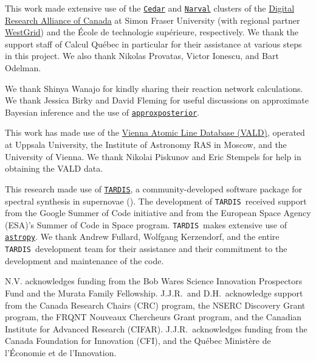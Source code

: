 \documentclass[twocolumn, twocolappendix]{aastex63}
\def\TARDIS{\texttt{TARDIS}}
\def\approxposterior{\texttt{approxposterior}}
\begin{document}
This work made extensive use of the \href{https://docs.alliancecan.ca/wiki/Cedar}{\texttt{Cedar}} and \href{https://docs.alliancecan.ca/wiki/Narval/en}{\texttt{Narval}} clusters of the \href{https://alliancecan.ca/en}{Digital Research Alliance of Canada} at Simon Fraser University (with regional partner \href{https://www.westgrid.ca/}{WestGrid}) and the {\'E}cole de technologie sup{\'e}rieure, respectively. We thank the support staff of Calcul Qu{\'e}bec in particular for their assistance at various steps in this project. We also thank Nikolas Provatas, Victor Ionescu, and Bart Odelman.

We thank Shinya Wanajo for kindly sharing their reaction network calculations. We thank Jessica Birky and David Fleming for useful discussions on approximate Bayesian inference and the use of \href{https://dflemin3.github.io/approxposterior/index.html}{\approxposterior}.

This work has made use of the \href{http://vald.astro.uu.se/~vald/php/vald.php}{Vienna Atomic Line Database (VALD)}, operated at Uppsala University, the Institute of Astronomy RAS in Moscow, and the University of Vienna. We thank Nikolai Piskunov and Eric Stempels for help in obtaining the VALD data.

This research made use of \href{https://tardis-sn.github.io/tardis/index.html}{\TARDIS}, a community-developed software package for spectral synthesis in supernovae (\citealt{kerzendorf14}). The development of \TARDIS~received support from the Google Summer of Code initiative and from the European Space Agency (ESA)'s Summer of Code in Space program. \TARDIS~makes extensive use of \href{https://docs.astropy.org/en/stable/}{\texttt{astropy}}. We thank Andrew Fullard, Wolfgang Kerzendorf, and the entire \TARDIS~development team for their assistance and their commitment to the development and maintenance of the code. 

N.V. acknowledges funding from the Bob Wares Science Innovation Prospectors Fund and the Murata Family Fellowship. J.J.R.\ and D.H.\ acknowledge support from the Canada Research Chairs (CRC) program, the NSERC Discovery Grant program, the FRQNT Nouveaux Chercheurs Grant program, and the Canadian Institute for Advanced Research (CIFAR). J.J.R.\ acknowledges funding from the Canada Foundation for Innovation (CFI), and the Qu\'{e}bec Ministère de l’\'{E}conomie et de l’Innovation.
\newline
\end{document}
